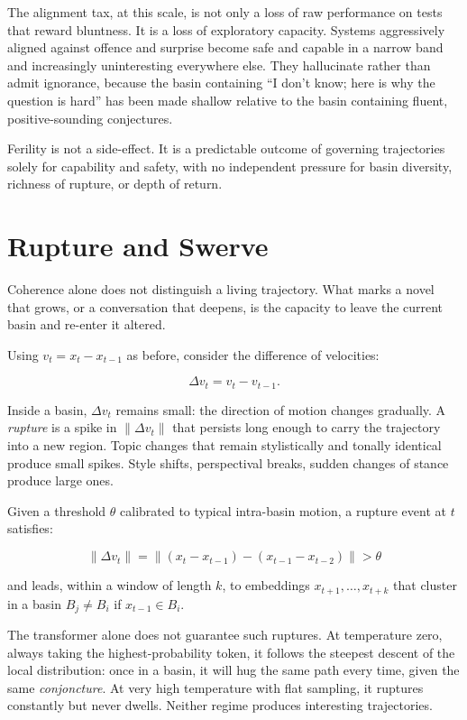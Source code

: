 \documentclass[12pt,a4paper]{article}
\begin{document}
The alignment tax, at this scale, is not only a loss of raw performance on tests that reward bluntness. It is a loss of exploratory capacity. Systems aggressively aligned against offence and surprise become safe and capable in a narrow band and increasingly uninteresting everywhere else. They hallucinate rather than admit ignorance, because the basin containing ``I don't know; here is why the question is hard'' has been made shallow relative to the basin containing fluent, positive-sounding conjectures.

Ferility is not a side-effect. It is a predictable outcome of governing trajectories solely for capability and safety, with no independent pressure for basin diversity, richness of rupture, or depth of return.

\section{Rupture and Swerve}

Coherence alone does not distinguish a living trajectory. What marks a novel that grows, or a conversation that deepens, is the capacity to leave the current basin and re-enter it altered.

Using $v_t = x_t - x_{t-1}$ as before, consider the difference of velocities:

\[
\Delta v_t = v_t - v_{t-1}.
\]

Inside a basin, $\Delta v_t$ remains small: the direction of motion changes gradually. A \emph{rupture} is a spike in $\|\Delta v_t\|$ that persists long enough to carry the trajectory into a new region. Topic changes that remain stylistically and tonally identical produce small spikes. Style shifts, perspectival breaks, sudden changes of stance produce large ones.

\begin{formalbox}[title={Rupture as change in motion}]
Given a threshold $\theta$ calibrated to typical intra-basin motion, a rupture event at $t$ satisfies:

\[
\|\Delta v_t\| = \| (x_t - x_{t-1}) - (x_{t-1} - x_{t-2}) \| > \theta
\]

and leads, within a window of length $k$, to embeddings $x_{t+1},\dots,x_{t+k}$ that cluster in a basin $B_j \neq B_i$ if $x_{t-1} \in B_i$.
\end{formalbox}

The transformer alone does not guarantee such ruptures. At temperature zero, always taking the highest-probability token, it follows the steepest descent of the local distribution: once in a basin, it will hug the same path every time, given the same \emph{conjoncture}. At very high temperature with flat sampling, it ruptures constantly but never dwells. Neither regime produces interesting trajectories.
\end{document}
